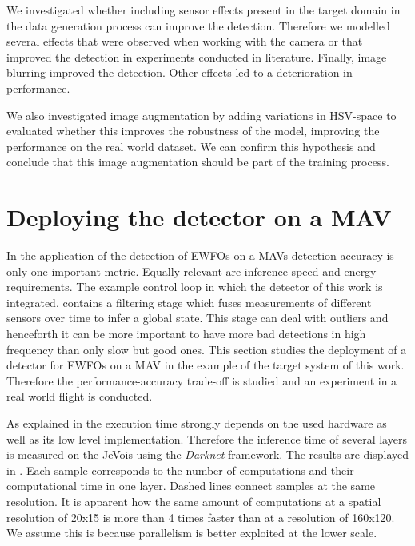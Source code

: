 We investigated whether including sensor effects present in the target domain in the data generation process can improve the detection. Therefore we modelled several effects that were observed when working with the camera or that improved the detection in experiments conducted in literature. Finally, image blurring improved the detection. Other effects led to a deterioration in performance.

We also investigated image augmentation by adding variations in HSV-space to evaluated whether this improves the robustness of the model, improving the performance on the real world dataset. We can confirm this hypothesis and conclude that this image augmentation should be part of the training process.

\section{Deploying the detector on a \ac{MAV}}

In the application of the detection of \acp{EWFO} on a \acp{MAV} detection accuracy is only one important metric. Equally relevant are inference speed and energy requirements. The example control loop in which the detector of this work is integrated, contains a filtering stage which fuses measurements of different sensors over time to infer a global state. This stage can deal with outliers and henceforth it can be more important to have more bad detections in high frequency than only slow but good ones. This section studies the deployment of a detector for \acp{EWFO} on a \ac{MAV} in the example of the target system of this work. Therefore the performance-accuracy trade-off is studied and an experiment in a real world flight is conducted.

As explained in  the execution time strongly depends on the used hardware as well as its low level implementation. Therefore the inference time of several layers is measured on the JeVois using the \textit{Darknet} framework. The results are displayed in . Each sample corresponds to the number of computations and their computational time in one layer. Dashed lines connect samples at the same resolution. It is apparent how the same amount of computations at a spatial resolution of 20x15 is more than 4 times faster than at a resolution of 160x120. We assume this is because parallelism is better exploited at the lower scale.

